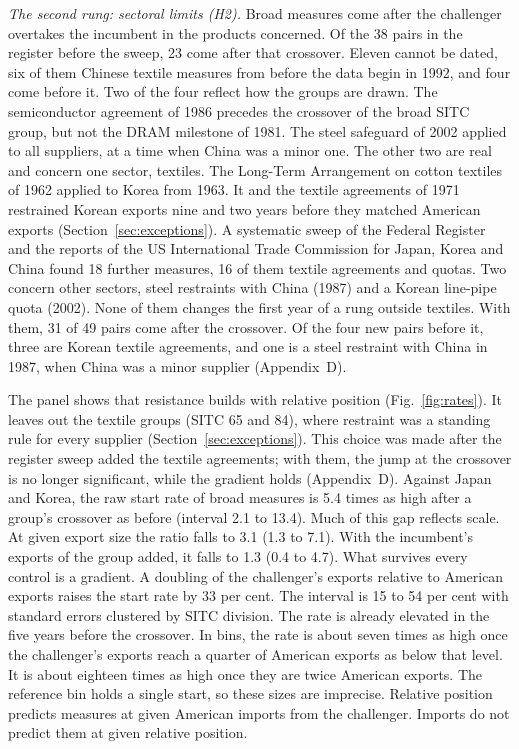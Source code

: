 \documentclass[review,authoryear,12pt]{elsarticle}
\begin{document}
\emph{The second rung: sectoral limits (H2).} Broad measures come after the challenger overtakes the incumbent in the products concerned. Of the 38 pairs in the register before the sweep, 23 come after that crossover. Eleven cannot be dated, six of them Chinese textile measures from before the data begin in 1992, and four come before it. Two of the four reflect how the groups are drawn. The semiconductor agreement of 1986 precedes the crossover of the broad SITC group, but not the DRAM milestone of 1981. The steel safeguard of 2002 applied to all suppliers, at a time when China was a minor one. The other two are real and concern one sector, textiles. The Long-Term Arrangement on cotton textiles of 1962 applied to Korea from 1963. It and the textile agreements of 1971 restrained Korean exports nine and two years before they matched American exports (Section~\ref{sec:exceptions}). A systematic sweep of the Federal Register and the reports of the US International Trade Commission for Japan, Korea and China found 18 further measures, 16 of them textile agreements and quotas. Two concern other sectors, steel restraints with China (1987) and a Korean line-pipe quota (2002). None of them changes the first year of a rung outside textiles. With them, 31 of 49 pairs come after the crossover. Of the four new pairs before it, three are Korean textile agreements, and one is a steel restraint with China in 1987, when China was a minor supplier (Appendix~D).

The panel shows that resistance builds with relative position (Fig.~\ref{fig:rates}). It leaves out the textile groups (SITC 65 and 84), where restraint was a standing rule for every supplier (Section~\ref{sec:exceptions}). This choice was made after the register sweep added the textile agreements; with them, the jump at the crossover is no longer significant, while the gradient holds (Appendix~D). Against Japan and Korea, the raw start rate of broad measures is 5.4 times as high after a group's crossover as before (interval 2.1 to 13.4). Much of this gap reflects scale. At given export size the ratio falls to 3.1 (1.3 to 7.1). With the incumbent's exports of the group added, it falls to 1.3 (0.4 to 4.7). What survives every control is a gradient. A doubling of the challenger's exports relative to American exports raises the start rate by 33 per cent. The interval is 15 to 54 per cent with standard errors clustered by SITC division. The rate is already elevated in the five years before the crossover. In bins, the rate is about seven times as high once the challenger's exports reach a quarter of American exports as below that level. It is about eighteen times as high once they are twice American exports. The reference bin holds a single start, so these sizes are imprecise. Relative position predicts measures at given American imports from the challenger. Imports do not predict them at given relative position.
\end{document}

